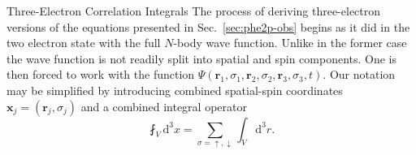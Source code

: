 \documentclass[a5paper, 9 pt]{extreport}
\begin{document}
\begin{appendices}
\begin{chapter}{Three-Electron Correlation Integrals \label{chap:moreIc}}
      The process of deriving three-electron versions of the equations presented in
      Sec.~\ref{sec:phe2p-obs} begins as it did in the two electron state with the full $N$-body wave
      function. Unlike in the former case the wave function is not readily split into spatial and spin
      components. One is then forced to work with the function $\Psi(\mathbf{r}_1, \sigma_1,
      \mathbf{r}_2, \sigma_2, \mathbf{r}_3, \sigma_3, t)$. Our notation may be simplified by
      introducing combined spatial-spin coordinates $\mathbf{x}_j = (\mathbf{r}_j, \sigma_j)$ and a
      combined integral operator
      \begin{equation} \label{eq:combInt}
         \fint_V \mathrm{d}^3x = \sum\limits_{\sigma = \uparrow, \downarrow} \int_V \mathrm{d}^3 r.
      \end{equation}



\end{chapter}
\end{appendices}
\end{document}
